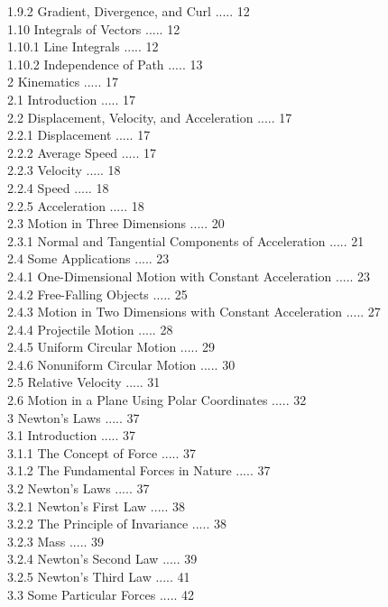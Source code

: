 \documentclass[10pt]{article}
\begin{document}
1.9.2 Gradient, Divergence, and Curl ..... 12\\
1.10 Integrals of Vectors ..... 12\\
1.10.1 Line Integrals ..... 12\\
1.10.2 Independence of Path ..... 13\\
2 Kinematics ..... 17\\
2.1 Introduction ..... 17\\
2.2 Displacement, Velocity, and Acceleration ..... 17\\
2.2.1 Displacement ..... 17\\
2.2.2 Average Speed ..... 17\\
2.2.3 Velocity ..... 18\\
2.2.4 Speed ..... 18\\
2.2.5 Acceleration ..... 18\\
2.3 Motion in Three Dimensions ..... 20\\
2.3.1 Normal and Tangential Components of Acceleration ..... 21\\
2.4 Some Applications ..... 23\\
2.4.1 One-Dimensional Motion with Constant Acceleration ..... 23\\
2.4.2 Free-Falling Objects ..... 25\\
2.4.3 Motion in Two Dimensions with Constant Acceleration ..... 27\\
2.4.4 Projectile Motion ..... 28\\
2.4.5 Uniform Circular Motion ..... 29\\
2.4.6 Nonuniform Circular Motion ..... 30\\
2.5 Relative Velocity ..... 31\\
2.6 Motion in a Plane Using Polar Coordinates ..... 32\\
3 Newton's Laws ..... 37\\
3.1 Introduction ..... 37\\
3.1.1 The Concept of Force ..... 37\\
3.1.2 The Fundamental Forces in Nature ..... 37\\
3.2 Newton's Laws ..... 37\\
3.2.1 Newton's First Law ..... 38\\
3.2.2 The Principle of Invariance ..... 38\\
3.2.3 Mass ..... 39\\
3.2.4 Newton's Second Law ..... 39\\
3.2.5 Newton's Third Law ..... 41\\
3.3 Some Particular Forces ..... 42\\
\end{document}
